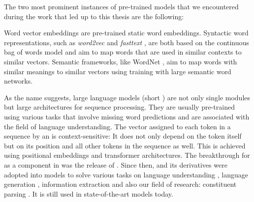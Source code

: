 \documentclass[../document.tex]{subfiles}
\begin{document}
    The two most prominent instances of pre-trained models that we encountered during the work that led up to this thesis are the following:
    \begin{compactitem}
        \item
            Word vector embeddings are pre-trained static word embeddings.
            Syntactic word representations, such as \emph{word2vec} \citep{word2vec} and \emph{fasttext} \citep{fasttext}, are both based on the continuous bag of words model and aim to map words that are used in similar contexts to similar vectors.
            Semantic frameworks, like WordNet \citep{wordnet}, aim to map words with similar meanings to similar vectors using training with large semantic word networks.
        \item
            As the name suggests, large language models (short ) are not only single modules but large architectures for sequence processing.
            They are usually pre-trained using various tasks that involve missing word predictions and are associated with the field of language understanding.
            The vector assigned to each token in a sequence by an  is context-sensitive:
                It does not only depend on the token itself but on its position and all other tokens in the sequence as well.
                This is achieved using positional embeddings and transformer architectures.
            The breakthrough for  as a component in  was the release of . \citep{Devlin2019}
            Since then,  and its derivatives were adopted into models to solve various tasks on language understanding \citep[question answering, entailment recognition, sentiment analysis, i.a.]{Devlin2019, roberta}, language generation \citep[summarization, translation, i.a.]{bertgeneration}, information extraction \citep[named entity recognition, relation extraction]{biobert} and also our field of research: constituent parsing \citep{Cor20, FerGom20a, FerGom22,Coa21, Sun22}.
            It is still used in state-of-the-art models today.
    \end{compactitem}
\end{document}

